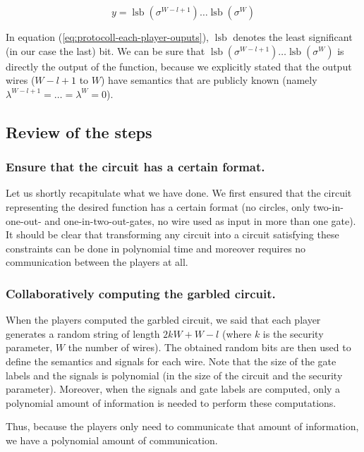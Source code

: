 \message{ !name(seminar.tex)}\documentclass{llncs}
\DeclareMathOperator{\lsb}{lsb}
\begin{document}
\begin{equation}
  \label{eq:protocoll-each-player-ouputs}
  y=\lsb(\sigma^{W-l+1})\dots\lsb(\sigma^W)
\end{equation}

In equation (\ref{eq:protocoll-each-player-ouputs}), $\lsb$ denotes the least significant (in our case the last) bit. We can be sure that $\lsb(\sigma^{W-l+1})\dots\lsb(\sigma^W)$ is directly the output of the function, because we explicitly stated that the output wires ($W-l+1$ to $W$) have semantics that are publicly known (namely $\lambda^{W-l+1}=\dots=\lambda^W=0$).

\subsection{Review of the steps}
\label{sec:review-of-the-protocol}

\subsubsection{Ensure that the circuit has a certain format.}
\label{sec:ensure-that-circuit-has-a-certain-format}

Let us shortly recapitulate what we have done. We first ensured that the circuit representing the desired function has a certain format (no circles, only two-in-one-out- and one-in-two-out-gates, no wire used as input in more than one gate). It should be clear that transforming any circuit into a circuit satisfying these constraints can be done in polynomial time and moreover requires no communication between the players at all.

\subsubsection{Collaboratively computing the garbled circuit.}
\label{sec:review-computing-garbled-circuit}

When the players computed the garbled circuit, we said that each player generates a random string of length $2kW+W-l$ (where $k$ is the security parameter, $W$ the number of wires). The obtained random bits are then used to define the semantics and signals for each wire. Note that the size of the gate labels and the signals is polynomial (in the size of the circuit and the security parameter). Moreover, when the signals and gate labels are computed, only a polynomial amount of information is needed to perform these computations.

Thus, because the players only need to communicate that amount of information, we have a polynomial amount of communication.
\end{document}
